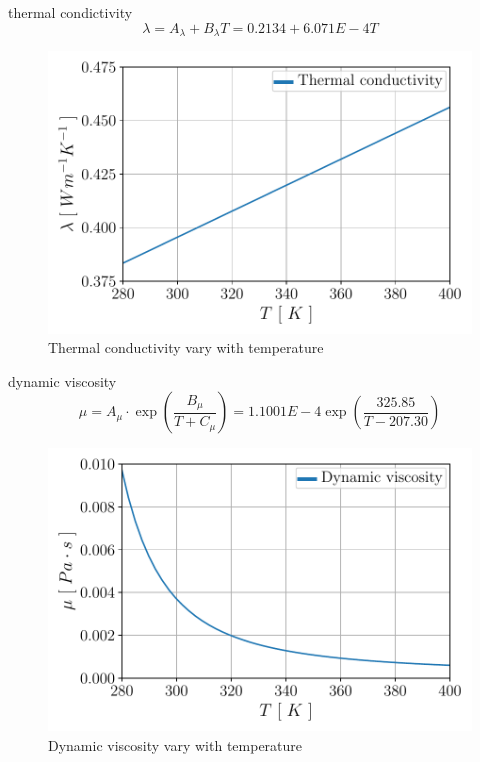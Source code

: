 \documentclass[12pt,oneside]{jbook}
\begin{document}
thermal condictivity
\begin{equation}
	\lambda = A_{\lambda}+B_{\lambda} T = 0.2134 + 6.071E-4T
	\label{lambda}
\end{equation}
\begin{figure}[ht]
	\vspace{0zh}
	\begin{center}
		\includegraphics[width=0.65\linewidth]{fig/mp_lambda.pdf}
		\vspace{-1zh}
		\caption{Thermal conductivity vary with temperature}
		\label{lambda}
	\end{center}
	\vspace{0zh}
\end{figure}


dynamic viscosity
\begin{equation}
	\mu = A_{\mu}\cdot \exp \left( \frac{B_{\mu}}{T+C_{\mu}} \right) = 1.1001E-4\exp \left( \frac{325.85}{T-207.30} \right)
	\label{mu}
\end{equation}
\begin{figure}[ht]
	\vspace{0zh}
	\begin{center}
		\includegraphics[width=0.65\linewidth]{fig/mp_mu.pdf}
		\vspace{-1zh}
		\caption{Dynamic viscosity vary with temperature}
		\label{mu}
	\end{center}
	\vspace{0zh}
\end{figure}
\end{document}

